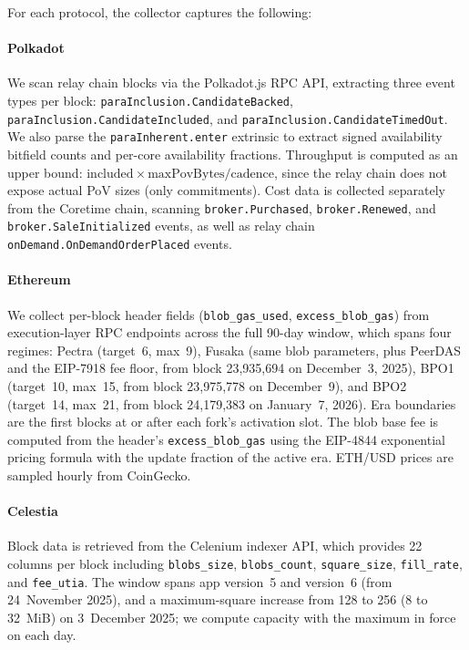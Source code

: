 For each protocol, the collector captures the following:

\paragraph{Polkadot}
We scan relay chain blocks via the Polkadot.js RPC API, extracting three event types per block: \texttt{paraInclusion.CandidateBacked}, \texttt{paraInclusion.CandidateIncluded}, and \texttt{paraInclusion.CandidateTimedOut}.
We also parse the \texttt{paraInherent.enter} extrinsic to extract signed availability bitfield counts and per-core availability fractions.
Throughput is computed as an upper bound: $\text{included} \times \text{maxPovBytes} / \text{cadence}$, since the relay chain does not expose actual PoV sizes (only commitments).
Cost data is collected separately from the Coretime chain, scanning \texttt{broker.Purchased}, \texttt{broker.Renewed}, and \texttt{broker.SaleInitialized} events, as well as relay chain \texttt{onDemand.OnDemandOrderPlaced} events.

\paragraph{Ethereum}
We collect per-block header fields (\texttt{blob\_gas\_used}, \texttt{excess\_blob\_gas}) from execution-layer RPC endpoints across the full 90-day window, which spans four regimes: Pectra (target~6, max~9), Fusaka (same blob parameters, plus PeerDAS and the EIP-7918 fee floor, from block 23{,}935{,}694 on December~3, 2025), BPO1 (target~10, max~15, from block 23{,}975{,}778 on December~9), and BPO2 (target~14, max~21, from block 24{,}179{,}383 on January~7, 2026). Era boundaries are the first blocks at or after each fork's activation slot.
The blob base fee is computed from the header's \texttt{excess\_blob\_gas} using the EIP-4844 exponential pricing formula with the update fraction of the active era.
ETH/USD prices are sampled hourly from CoinGecko.

\paragraph{Celestia}
Block data is retrieved from the Celenium indexer API, which provides 22 columns per block including \texttt{blobs\_size}, \texttt{blobs\_count}, \texttt{square\_size}, \texttt{fill\_rate}, and \texttt{fee\_utia}.
The window spans app version~5 and version~6 (from 24~November 2025), and a maximum-square increase from 128 to 256 (8 to 32~MiB) on 3~December 2025; we compute capacity with the maximum in force on each day.

